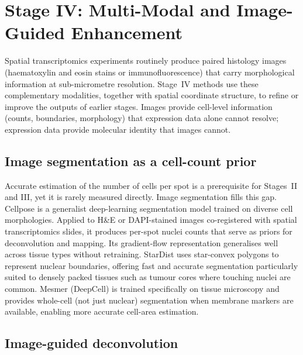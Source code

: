 \section{Stage IV: Multi-Modal and Image-Guided Enhancement}
\label{sec:stage4}

Spatial transcriptomics experiments routinely produce paired histology images (haematoxylin and eosin stains or immunofluorescence) that carry morphological information at sub-micrometre resolution. Stage~IV methods use these complementary modalities, together with spatial coordinate structure, to refine or improve the outputs of earlier stages. Images provide cell-level information (counts, boundaries, morphology) that expression data alone cannot resolve; expression data provide molecular identity that images cannot.

\subsection{Image segmentation as a cell-count prior}

Accurate estimation of the number of cells per spot is a prerequisite for Stages~II and III, yet it is rarely measured directly. Image segmentation fills this gap. Cellpose \citep{stringer2021cellpose} is a generalist deep-learning segmentation model trained on diverse cell morphologies. Applied to H\&E or DAPI-stained images co-registered with spatial transcriptomics slides, it produces per-spot nuclei counts that serve as priors for deconvolution and mapping. Its gradient-flow representation generalises well across tissue types without retraining. StarDist \citep{schmidt2018stardist} uses star-convex polygons to represent nuclear boundaries, offering fast and accurate segmentation particularly suited to densely packed tissues such as tumour cores where touching nuclei are common. Mesmer (DeepCell) \citep{greenwald2022mesmer} is trained specifically on tissue microscopy and provides whole-cell (not just nuclear) segmentation when membrane markers are available, enabling more accurate cell-area estimation.

\subsection{Image-guided deconvolution}


